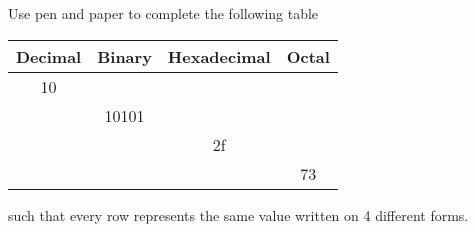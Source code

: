 Use pen and paper to complete the following table
    \begin{center}
      \begin{tabular}{|c|c|c|c|}
        \hline
        Decimal & Binary & Hexadecimal & Octal\\
        \hline
        10 &  &  & \\
        \hline
                & 10101 &  & \\
        \hline
                &  & 2f  & \\
        \hline
                &  &  & 73 \\
        \hline
      \end{tabular}
    \end{center}
    such that every row represents the same value written on 4 different forms.